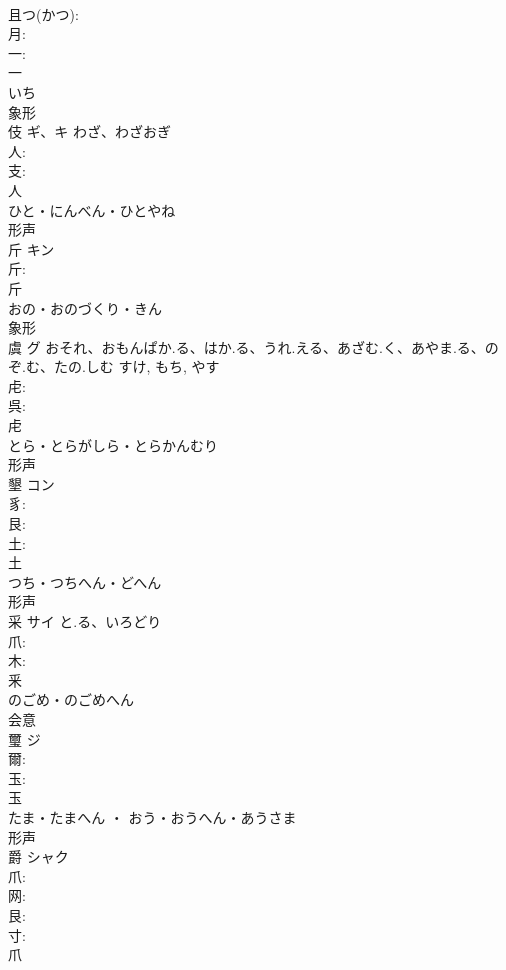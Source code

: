 \documentclass[8pt]{extreport}
\begin{document}
\begin{CJK}{UTF8}{min}
\\	且つ(かつ): 
\\	月: 
\\	一: 
\\	一	
\\	いち	
\\	象形 
\\	伎	ギ、キ	わざ、わざおぎ		
\\	人: 
\\	支: 
\\	人	
\\	ひと・にんべん・ひとやね	
\\	形声 
\\	斤	キン			
\\	斤: 
\\	斤	
\\	おの・おのづくり・きん	
\\	象形 
\\	虞	グ	おそれ、おもんぱか.る、はか.る、うれ.える、あざむ.く、あやま.る、のぞ.む、たの.しむ	すけ, もち, やす	
\\	虍: 
\\	呉: 
\\	虍	
\\	とら・とらがしら・とらかんむり	
\\	形声 
\\	墾	コン			
\\	豸: 
\\	艮: 
\\	土: 
\\	土	
\\	つち・つちへん・どへん	
\\	形声 
\\	采	サイ	と.る、いろどり		
\\	爪: 
\\	木: 
\\	釆	
\\	のごめ・のごめへん	
\\	会意 
\\	璽	ジ			
\\	爾: 
\\	玉: 
\\	玉	
\\	たま・たまへん ・ おう・おうへん・あうさま	
\\	形声 
\\	爵	シャク			
\\	爪: 
\\	网: 
\\	艮: 
\\	寸: 
\\	爪	

\end{CJK}
\end{document}
